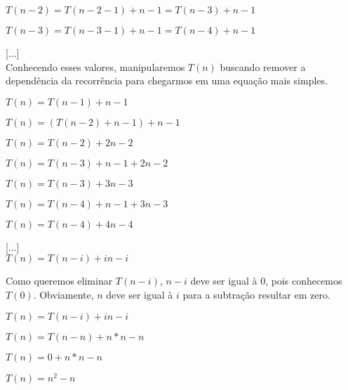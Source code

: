 \documentclass[a4paper, twocolumn]{article}
\theoremstyle{definition}
\begin{document}
$T(n-2) = T(n-2-1) + n - 1 = T(n-3) + n - 1$

$T(n-3) = T(n-3-1) + n - 1 = T(n-4) + n - 1$

[...] \\

Conhecendo esses valores, manipularemos $T(n)$ buscando remover a dependência da recorrência para chegarmos em uma equação mais simples.

$T(n) = T(n-1) + n - 1$

$T(n) = (T(n-2) + n - 1) + n - 1$

$T(n) = T(n-2) + 2n - 2$

$T(n) = T(n-3) + n - 1 + 2n - 2$ 

$T(n) = T(n-3) + 3n - 3$

$T(n) = T(n-4) + n - 1 + 3n - 3$ 

$T(n) = T(n-4) + 4n - 4$

[...] \\

$T(n) = T(n-i) + in - i$

Como queremos eliminar $T(n-i)$, $n-i$ deve ser igual à 0, pois conhecemos $T(0)$. Obviamente, $n$ deve ser igual à $i$ para a subtração resultar em zero.

$T(n) = T(n-i) + in - i$

$T(n) = T(n-n) + n*n - n$

$T(n) = 0 + n*n - n$

$T(n) = n^2 - n$
\end{document}
